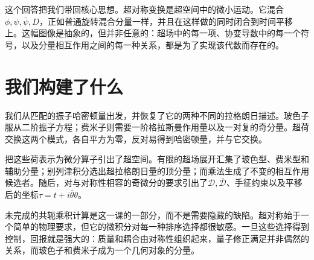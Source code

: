 这个回答把我们带回核心思想。超对称变换是超空间中的微小运动。它混合\(\phi,\psi,\bar\psi,D\)，正如普通旋转混合分量一样，并且在这样做的同时闭合到时间平移上。这幅图像是抽象的，但并非任意的：超场中的每一项、协变导数中的每一个符号，以及分量相互作用之间的每一种关系，都是为了实现该代数而存在的。

\section{我们构建了什么}

我们从匹配的振子哈密顿量出发，并恢复了它的两种不同的拉格朗日描述。玻色子服从二阶振子方程；费米子则需要一阶格拉斯曼作用量以及一对复的奇分量。超荷交换这两个模式，各自平方为零，反对易得到哈密顿量，并与它交换。

把这些荷表示为微分算子引出了超空间。有限的超场展开汇集了玻色型、费米型和辅助分量；别列津积分选出超拉格朗日量的顶分量；而乘法生成了不变的相互作用候选者。随后，对与对称性相容的奇微分的要求引出了\(\mathcal D,\bar{\mathcal D}\)、手征约束以及平移后的坐标\(\tau=t+i\bar\theta\theta\)。

未完成的共轭乘积计算是这一课的一部分，而不是需要隐藏的缺陷。超对称始于一个简单的物理要求，但它的微积分对每一种排序选择都很敏感。一旦这些选择得到控制，回报就是强大的：质量和耦合由对称性组织起来，量子修正满足并非偶然的关系，而玻色子和费米子成为一个几何对象的分量。

